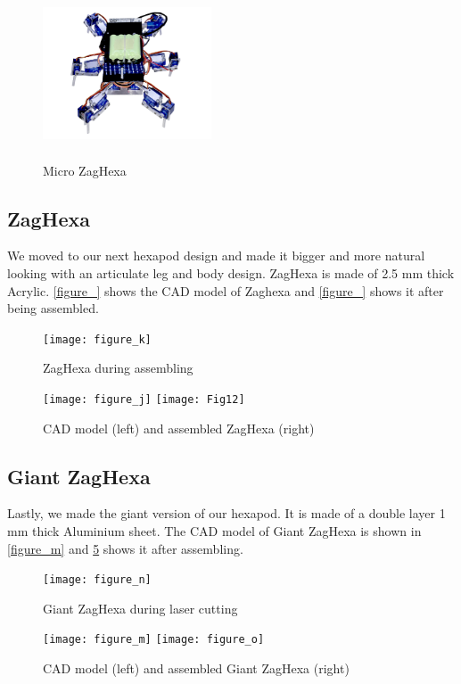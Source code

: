 \begin{figure}[H]
	\centering
	\includegraphics[width=5cm,height=5cm]{figures/uZagHexaFinal.png}
	\caption{Micro ZagHexa}
	\label{figure_i}
\end{figure}

\subsection{ZagHexa}
We moved to our next hexapod design and made it bigger and more natural looking with an articulate leg and body design. ZagHexa is made of 2.5 mm thick Acrylic. \ref{figure_} shows the CAD model of Zaghexa and \ref{figure_} shows it after being assembled.
\begin{figure}[H]
	\centering
	\texttt{[image: figure\_k]}
	\caption{ZagHexa during assembling}
	\label{figure_k}
\end{figure}
\begin{figure}[H]
	\centering
   \texttt{[image: figure\_j]}
	\texttt{[image: Fig12]}
	\caption{CAD model (left) and assembled ZagHexa (right)}
	\label{figure_l}
\end{figure}

\subsection{Giant ZagHexa}
Lastly, we made the giant version of our hexapod. It is made of a double layer 1 mm thick Aluminium sheet. The CAD model of Giant ZagHexa is shown in \ref{figure_m} and \ref{figure_o} shows it after assembling.
\begin{figure}[H]
	\centering
	\texttt{[image: figure\_n]}
	\caption{Giant ZagHexa during laser cutting}
	\label{figure_n}
\end{figure}
\begin{figure}[H]
	\centering
    	\texttt{[image: figure\_m]}
	\texttt{[image: figure\_o]}
	\caption{CAD model (left) and assembled Giant ZagHexa (right)}
	\label{figure_o}
\end{figure}


